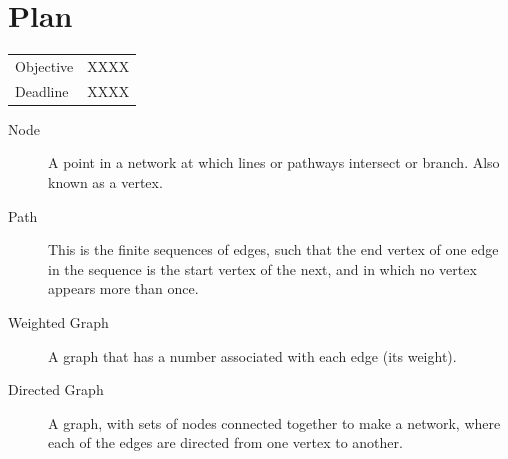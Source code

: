 \documentclass[a4paper]{article}
\begin{document}
\section{Plan}

\begin{tabular}{ll}
	Objective & XXXX \\
    Deadline & XXXX 
\end{tabular}


\begin{description}
\item[Node] A point in a network at which lines or pathways intersect or  branch. Also known as a vertex. 
\item[Path] This is the finite sequences of edges, such that the end vertex of one edge in the sequence is the start vertex of the next, and in which no vertex appears more than once. 
\item[Weighted Graph] A graph that has a number associated with each edge (its weight).
\item[Directed Graph] A graph, with sets of nodes connected together to make a network, where each of the edges are directed from one vertex to another. 
\end{description}






\end{document}
